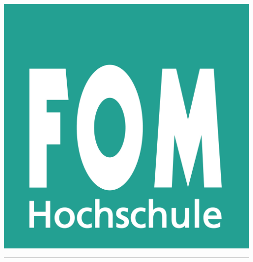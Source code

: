 \newlength{\logoWidth}
\newlength{\spalteEins}
\newlength{\spalteZwei}

\settowidth{\logoWidth}{\fbox{\normalsize\daStudiengang}}
\addtolength{\logoWidth}{-1ex}

\begin{titlepage}%
\begin{center}
  \sffamily
  \href{\daUniURL}{\includegraphics[width=\logoWidth]{bilder/FOM.jpg}} \\ %
  \hrule
  \begin{spacing}{1.8}%

\end{spacing}
\end{center}
\end{titlepage}
